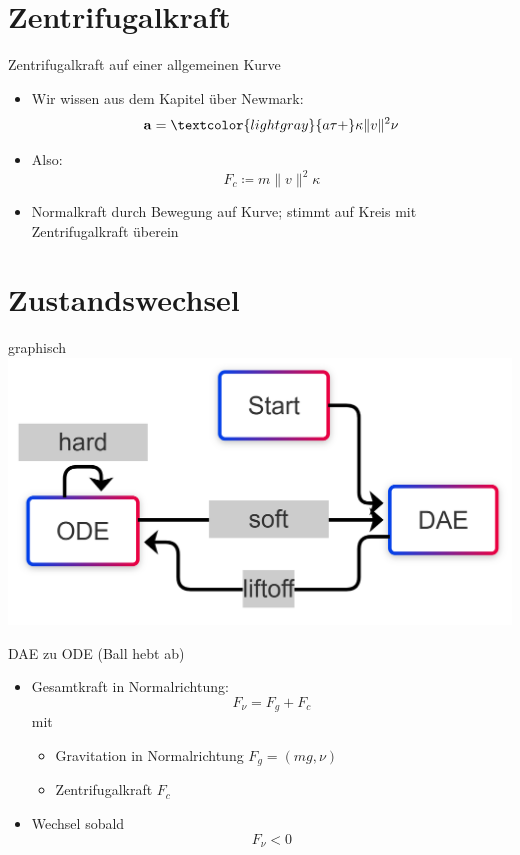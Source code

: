 \documentclass[aspectratio=169]{beamer}
\begin{document}
\section{Zentrifugalkraft}

\begin{frame}{Zentrifugalkraft auf einer allgemeinen Kurve}
\begin{itemize}
\item Wir wissen aus dem Kapitel über Newmark:
    \begin{equation*}
        \mathbf{a} = \textcolor{lightgray}{ a \tau + } \kappa \| v \|^2 \nu
    \end{equation*}
\item Also:
        \begin{equation*}
            F_c \coloneq m \| v \|^2 \kappa
        \end{equation*}
\item Normalkraft durch Bewegung auf Kurve; stimmt auf Kreis mit Zentrifugalkraft
        überein
\end{itemize}
\end{frame}

\section{Zustandswechsel}

\begin{frame}{graphisch}
	\includegraphics[scale=0.35]{./state_flowchart_2.png}
\end{frame}

\begin{frame}{DAE zu ODE (Ball hebt ab)}
\begin{itemize}
	\item Gesamtkraft in Normalrichtung:
	\[
	F_{\nu} = F_g + F_c
	\]
	mit
	\begin{itemize}
		\item Gravitation in Normalrichtung $F_g = (mg, \nu)$
		\item Zentrifugalkraft $F_c$
	\end{itemize}
	\item Wechsel sobald
	\[
	F_{\nu} < 0
	\]
\end{itemize}
\end{frame}
\end{document}
